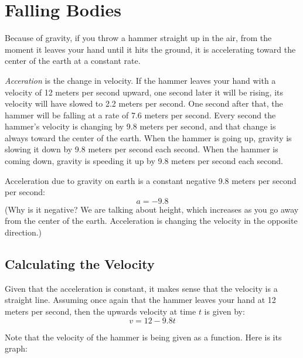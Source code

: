 \chapter{Falling Bodies}

Because of gravity, if you throw a hammer straight up in the air, from
the moment it leaves your hand until it hits the ground, it is
accelerating toward the center of the earth at a constant rate.

\emph{Acceration} is the change in velocity. If the hammer leaves your
hand with a velocity of 12 meters per second upward, one second later
it will be rising, its velocity will have slowed to 2.2 meters per
second. One second after that, the hammer will be falling at a rate of
7.6 meters per second. Every second the hammer's velocity is changing by
9.8 meters per second, and that change is always toward the center of
the earth. When the hammer is going up, gravity is slowing it down by
9.8 meters per second each second.  When the hammer is coming down,
gravity is speeding it up by 9.8 meters per second each second.

Acceleration due to gravity on earth is a constant negative 9.8 meters per second per second:
\begin{equation*}
a = -9.8   
\end{equation*}
(Why is it negative? We are talking about height, which increases as
you go away from the center of the earth. Acceleration is changing the
velocity in the opposite direction.)

\section{Calculating the Velocity}

Given that the acceleration is constant, it makes sense that the
velocity is a straight line. Assuming once again that the hammer
leaves your hand at 12 meters per second, then the upwards velocity at
time $t$ is given by:
\begin{equation*}
  v = 12 - 9.8t
\end{equation*}

Note that the velocity of the hammer is being given as a function. Here is its graph:



